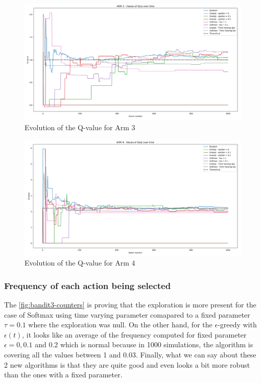 \documentclass{article}
\begin{document}
\begin{figure}[H]
  \centering
  \includegraphics[scale=0.37]{fig/bandit3-arm3.png}
  \caption{Evolution of the Q-value for Arm 3}
  \label{fig:bandit3-arm3}
\end{figure}

\begin{figure}[H]
  \centering
  \includegraphics[scale=0.34]{fig/bandit3-arm4.png}
  \caption{Evolution of the Q-value for Arm 4}
  \label{fig:bandit3-arm4}
\end{figure}

\subsubsection{Frequency of each action being selected}

The \autoref{fig:bandit3-counters} is proving that the exploration is more present for the case of Softmax using time varying parameter comapared to a fixed parameter $\tau = 0.1$ where the exploration was null. On the other hand, for the $\epsilon$-greedy with $\epsilon (t)$, it looks like an average of the frequency computed for fixed parameter $\epsilon = 0, 0.1$ and $0.2$ which is normal because in 1000 simulations, the algorithm is covering all the values between 1 and 0.03. Finally, what we can say about these 2 new algorithms is that they are quite good and even looks a bit more robust than the ones with a fixed parameter.  
\end{document}
